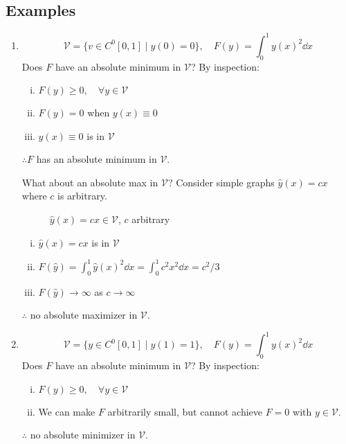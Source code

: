 \documentclass[12pt,twoside]{article}
\begin{document}
\subsection{Examples}
\begin{enumerate}
\item
  \begin{equation*}
    \mathcal{V} = \{v\in C^0[0,1]\;|\; y(0)=0\},\quad F(y)=\int_0^1{y(x)}^2\dd{x}
  \end{equation*}
  Does $F$ have an absolute minimum in $\mathcal{V}$? By inspection:
  \begin{enumerate}[(i)]
  \item $F(y)\ge0,\quad \forall y\in\mathcal{V}$
  \item $F(y)=0$ when $y(x)\equiv0$
  \item $y(x)\equiv0$ is in $\mathcal{V}$
  \end{enumerate}
  $\therefore F$ has an absolute minimum in $\mathcal{V}$.

  What about an absolute max in $\mathcal{V}$? Consider simple graphs
  $\hat{y}(x)=cx$ where $c$ is arbitrary.

  \begin{figure}[ht]
    \centering
    \caption{$\hat{y}(x)=cx\in\mathcal{V}$, $c$ arbitrary}
    \label{fig:v-equation-3}
  \end{figure}

  \begin{enumerate}[(i)]
  \item $\hat{y}(x)=cx$ is in $\mathcal{V}$
  \item $F(\hat{y})=\int_0^1{\hat{y}(x)}^2\dd{x} = \int_0^1c^2x^2\dd{x}=c^2/3$
  \item $F(\hat{y})\rightarrow\infty$ as $c\rightarrow\infty$
  \end{enumerate}
  $\therefore$ no absolute maximizer in $\mathcal{V}$.
\item
  \begin{equation*}
    \mathcal{V} = \{y\in C^0[0,1] \;|\; y(1)=1\},\quad F(y)=\int_0^1{y(x)}^2\dd{x}
  \end{equation*}
  Does $F$ have an absolute minimum in $\mathcal{V}$? By inspection:
  \begin{enumerate}[(i)]
  \item $F(y)\ge0,\quad \forall y\in\mathcal{V}$
  \item We can make $F$ arbitrarily small, but cannot achieve $F=0$ with
    $y\in\mathcal{V}$.
  \end{enumerate}
  $\therefore$ no absolute minimizer in $\mathcal{V}$.


\end{enumerate}
\end{document}
